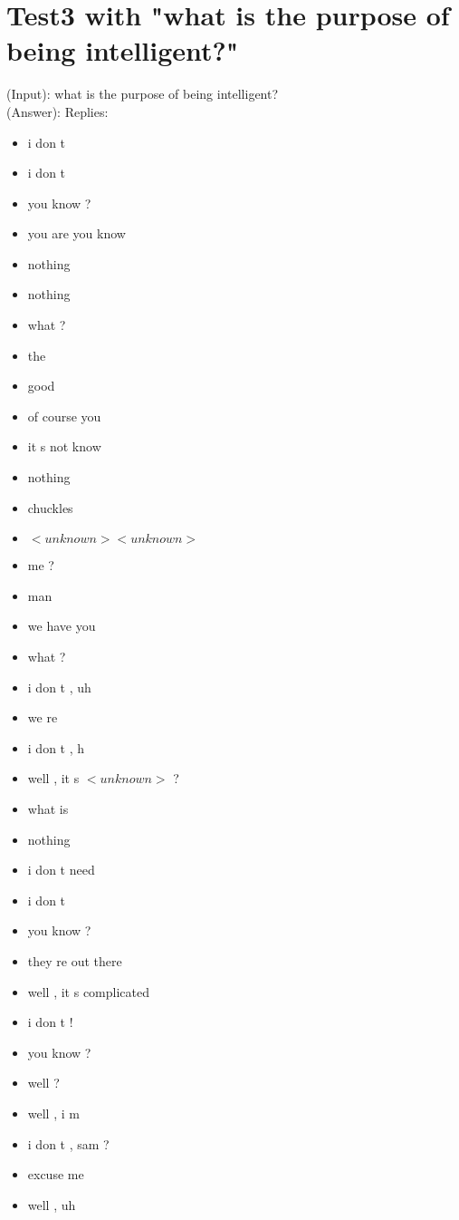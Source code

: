 \section{Test3 with "what is the purpose of being intelligent?"}
\label{apendix:result3:Beam-search-200:OpenSubtitle}
(Input): what is the purpose of being intelligent?\\
(Answer): Replies:
\begin{multicols}{2}
	\begin{itemize}
		\item i don t
		\item i don t
		\item you know ?
		\item you are you know
		\item nothing
		\item nothing
		\item what ?
		\item the
		\item good
		\item of course you
		\item it s not know
		\item nothing
		\item chuckles
		\item $<unknown> <unknown>$
		\item me ?
		\item man
		\item we have you
		\item what ?
		\item i don t , uh
		\item we re
		\item i don t , h
		\item well , it s $<unknown>$ ?
		\item what is
		\item nothing
		\item i don t need
		\item i don t
		\item you know ?
		\item they re out there
		\item well , it s complicated
		\item i don t !
		\item you know ?
		\item well ?
		\item well , i m
		\item i don t , sam ?
		\item excuse me
		\item well , uh

\end{itemize}
\end{multicols}
